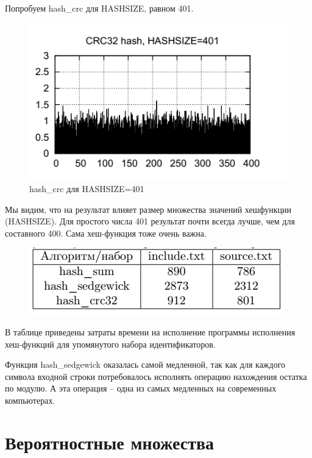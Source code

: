 \documentclass{beamer}
\begin{document}
\begin{frame}[t]
	Попробуем hash\_crc для HASHSIZE, равном 401.
	\begin{figure}[h]
		\centering
		\includegraphics[scale=0.7]{images/lec08-pic08.png}
		\caption{hash\_crc для HASHSIZE=401}
	\end{figure}
\end{frame}

\begin{frame}[t]
	Мы видим, что на результат влияет размер множества значений хешфункции (HASHSIZE). Для простого числа 401 результат почти всегда лучше, чем для составного 400. Сама хеш-функция тоже очень важна.
	
	\begin{figure}[h]
		\centering
		\includegraphics[scale=1]{images/lec08-pic09.png}
	\end{figure}	
	
	В таблице приведены затраты времени на исполнение программы исполнения хеш-функций для упомянутого набора идентификаторов. 
	
	Функция hash\_sedgewick оказалась самой медленной, так как для каждого символа входной строки потребовалось исполнять операцию нахождения остатка по модулю. А эта операция -- одна из самых медленных на современных компьютерах.
\end{frame}

\section{Вероятностные множества}
\end{document}
